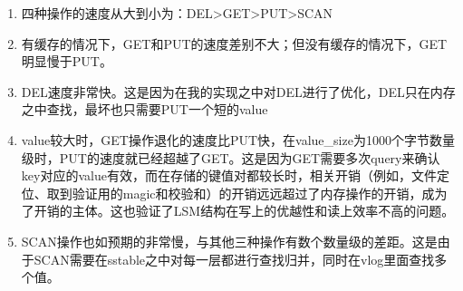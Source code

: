 \documentclass[UTF8]{article}
\begin{document}
\begin{enumerate}
     \item 四种操作的速度从大到小为：DEL>GET>PUT>SCAN
     \item 有缓存的情况下，GET和PUT的速度差别不大；但没有缓存的情况下，GET明显慢于PUT。
     \item DEL速度非常快。这是因为在我的实现之中对DEL进行了优化，DEL只在内存之中查找，最坏也只需要PUT一个短的value
     \item value较大时，GET操作退化的速度比PUT快，在value\_size为1000个字节数量级时，PUT的速度就已经超越了GET。这是因为GET需要多次query来确认key对应的value有效，而在存储的键值对都较长时，相关开销（例如，文件定位、取到验证用的magic和校验和）的开销远远超过了内存操作的开销，成为了开销的主体。这也验证了LSM结构在写上的优越性和读上效率不高的问题。
     \item SCAN操作也如预期的非常慢，与其他三种操作有数个数量级的差距。这是由于SCAN需要在sstable之中对每一层都进行查找归并，同时在vlog里面查找多个值。
\end{enumerate}
\end{document}
